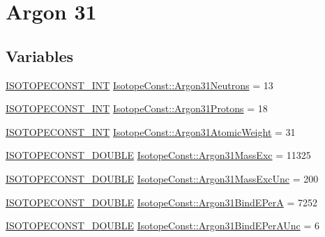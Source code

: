 \hypertarget{group___isotope_const-_argon-_ar31}{}\section{Argon 31}
\label{group___isotope_const-_argon-_ar31}
\subsection*{Variables}
\begin{DoxyCompactItemize}
\item 
\mbox{\hyperlink{group___isotope_const-_macros_ga5f18360b3e99483a35c32d789e62621c}{I\+S\+O\+T\+O\+P\+E\+C\+O\+N\+S\+T\+\_\+\+I\+NT}} \mbox{\hyperlink{group___isotope_const-_argon-_ar31_ga15abe4a03c9131bbd00f1d99bb021812}{Isotope\+Const\+::\+Argon31\+Neutrons}} = 13
\item 
\mbox{\hyperlink{group___isotope_const-_macros_ga5f18360b3e99483a35c32d789e62621c}{I\+S\+O\+T\+O\+P\+E\+C\+O\+N\+S\+T\+\_\+\+I\+NT}} \mbox{\hyperlink{group___isotope_const-_argon-_ar31_gaf7a2370129e9ceb4b6af5e3a4a8d7a8f}{Isotope\+Const\+::\+Argon31\+Protons}} = 18
\item 
\mbox{\hyperlink{group___isotope_const-_macros_ga5f18360b3e99483a35c32d789e62621c}{I\+S\+O\+T\+O\+P\+E\+C\+O\+N\+S\+T\+\_\+\+I\+NT}} \mbox{\hyperlink{group___isotope_const-_argon-_ar31_gae4e7b91c923340f3e5c78f15bd593d5d}{Isotope\+Const\+::\+Argon31\+Atomic\+Weight}} = 31
\item 
\mbox{\hyperlink{group___isotope_const-_macros_ga8f45a7272ce02c0b4c65c44636ed719a}{I\+S\+O\+T\+O\+P\+E\+C\+O\+N\+S\+T\+\_\+\+D\+O\+U\+B\+LE}} \mbox{\hyperlink{group___isotope_const-_argon-_ar31_gaff0996a5eb7c4df7bcc1f13085c8c76e}{Isotope\+Const\+::\+Argon31\+Mass\+Exc}} = 11325
\item 
\mbox{\hyperlink{group___isotope_const-_macros_ga8f45a7272ce02c0b4c65c44636ed719a}{I\+S\+O\+T\+O\+P\+E\+C\+O\+N\+S\+T\+\_\+\+D\+O\+U\+B\+LE}} \mbox{\hyperlink{group___isotope_const-_argon-_ar31_gaa9befa252b11557f2f69beb9d79f0991}{Isotope\+Const\+::\+Argon31\+Mass\+Exc\+Unc}} = 200
\item 
\mbox{\hyperlink{group___isotope_const-_macros_ga8f45a7272ce02c0b4c65c44636ed719a}{I\+S\+O\+T\+O\+P\+E\+C\+O\+N\+S\+T\+\_\+\+D\+O\+U\+B\+LE}} \mbox{\hyperlink{group___isotope_const-_argon-_ar31_gaa3d40ea136ef40ffa4cb6e905960fc01}{Isotope\+Const\+::\+Argon31\+Bind\+E\+PerA}} = 7252
\item 
\mbox{\hyperlink{group___isotope_const-_macros_ga8f45a7272ce02c0b4c65c44636ed719a}{I\+S\+O\+T\+O\+P\+E\+C\+O\+N\+S\+T\+\_\+\+D\+O\+U\+B\+LE}} \mbox{\hyperlink{group___isotope_const-_argon-_ar31_gae4d8ebacb5c8867159b6baf88924d7e9}{Isotope\+Const\+::\+Argon31\+Bind\+E\+Per\+A\+Unc}} = 6

\end{DoxyCompactItemize}
